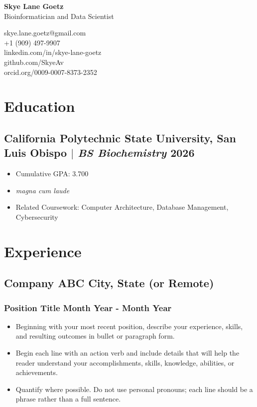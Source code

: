 \documentclass[11pt]{article} %
\begin{document}
\begin{center}
	\begin{minipage}{0.5\textwidth}
		{\Huge\bfseries
			Skye Lane Goetz %
		} \\ \medskip
		Bioinformatician and Data Scientist %
	\end{minipage} \hfill
	\begin{minipage}{0.4\textwidth}
		\raggedleft
		skye.lane.goetz@gmail.com \\
		+1 (909) 497-9907 \\
		linkedin.com/in/skye-lane-goetz \\
		github.com/SkyeAv \\
		orcid.org/0009-0007-8373-2352
	\end{minipage}
\end{center}

\section{Education}
\subsection{\small California Polytechnic State University, San Luis Obispo $|$ {\normalfont\itshape BS Biochemistry} \hfill 2026}
\begin{itemize}
	\item Cumulative GPA: 3.700
	\item \textit{magna cum laude} 
  \item Related Coursework: Computer Architecture, Database Management, Cybersecurity
\end{itemize}

\section{Experience}
\subsection{Company ABC \hfill City, State (or Remote)}
\subsubsection{Position Title \hfill  Month Year - Month Year}
\begin{itemize}
	\item Beginning with your most recent position, describe your experience, skills, and resulting outcomes in bullet or paragraph form.
	\item Begin each line with an action verb and include details that will help the reader understand your accomplishments, skills, knowledge, abilities, or achievements.
	\item Quantify where possible. Do not use personal pronouns; each line should be a phrase rather than a full sentence.
\end{itemize}
\end{document}
